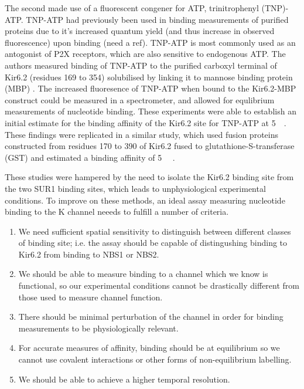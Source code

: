 The second made use of a fluorescent congener for ATP, trinitrophenyl (TNP)-ATP.
TNP-ATP had previously been used in binding measurements of purified proteins due to it's increased quantum yield (and thus increase in observed fluorescence) upon binding (need a ref).
TNP-ATP is most commonly used as an antogonist of P2X receptors, which are also sensitive to endogenous ATP.
The authors measured binding of TNP-ATP to the purified carboxyl terminal of Kir6.2 (residues 169 to 354) solubilised by linking it to mannose binding protein (MBP) \cite{vanoye_carboxyl_2002}.
The increased fluoresence of TNP-ATP when bound to the Kir6.2-MBP construct could be measured in a spectrometer, and allowed for equlibrium measurements of nucleotide binding.
These experiments were able to establish an initial estimate for the binding affinity of the Kir6.2 site for TNP-ATP at \SI{5}{\micro\Molar}.
These findings were replicated in a similar study, which used fusion proteins constructed from residues 170 to 390 of Kir6.2 fused to glutathione-S-transferase (GST) and estimated a binding affinity of \SI{5}{\micro\Molar} \cite{wang_inhibition_2006}.

These studies were hampered by the need to isolate the Kir6.2 binding site from the two SUR1 binding sites, which leads to unphysiological experimental conditions.
To improve on these methods, an ideal assay measuring nucleotide binding to the K\ATP{} channel neeeds to fulfill a number of criteria.

\begin{enumerate}
	\item We need sufficient spatial sensitivity to distinguish between different classes of binding site; i.e. the assay should be capable of distingushing binding to Kir6.2 from binding to NBS1 or NBS2.
	\item We should be able to measure binding to a channel which we know is functional, so our experimental conditions cannot be drastically different from those used to measure channel function.
	\item There should be minimal perturbation of the channel in order for binding measurements to be physiologically relevant.
	\item For accurate measures of affinity, binding should be at equilibrium so we cannot use covalent interactions or other forms of non-equilibrium labelling.
	\item We should be able to achieve a higher temporal resolution.
\end{enumerate}

